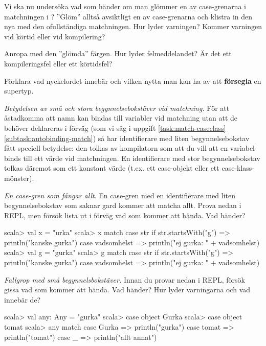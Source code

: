 \Subtask Vi ska nu undersöka vad som händer om man glömmer en av case-grenarna i matchningen i ? ''Glöm'' alltså avsiktligt en av case-grenarna och klistra in den nya  med den ofullständiga matchningen. Hur lyder varningen? Kommer varningen vid körtid eller vid kompilering? 

\Subtask Anropa  med den ''glömda'' färgen. Hur lyder felmeddelandet? Är det ett kompileringsfel eller ett körtidsfel?

\Subtask\Pen Förklara vad nyckelordet  innebär och vilken nytta man kan ha av att \textbf{försegla} en supertyp.


\Task \emph{Betydelsen av små och stora begynnelsebokstäver vid matchning.} För att åstadkomma att namn kan bindas till variabler vid matchning utan att de behöver deklareras i förväg (som vi såg i uppgift \ref{task:match-caseclass}\ref{subtask:autobinding-match}) så har identifierare med liten begynnelsebokstav fått speciell betydelse: den tolkas av kompilatorn som att du vill att en variabel  binds till ett värde vid matchningen. En identifierare med stor begynnelsebokstav tolkas däremot som ett konstant värde (t.ex. ett case-objekt eller ett case-klass-mönster).

\Subtask \emph{En case-gren som fångar allt}. En case-gren med en identifierare med liten begynnelsebokstav som saknar gard kommer att matcha allt. Prova nedan i REPL, men försök lista ut i förväg vad som kommer att hända. Vad händer?
\begin{REPL}
scala> val x = "urka"
scala> x match {
         case str if str.startsWith("g") => println("kanske gurka")
         case vadsomhelst => println("ej gurka: " + vadsomhelst) 
       }
scala> val g = "gurka"
scala> g match {
         case str if str.startsWith("g") => println("kanske gurka")
         case vadsomhelst => println("ej gurka: " + vadsomhelst) 
       }
\end{REPL}

\Subtask \emph{Fallgrop med små begynnelsbokstäver.} Innan du provar nedan i REPL, försök gissa vad som kommer att hända. Vad händer? Hur lyder varningarna och vad innebär de?
\begin{REPL}       
scala> val any: Any = "gurka"
scala> case object Gurka
scala> case object tomat
scala> any match {
         case Gurka => println("gurka") 
         case tomat => println("tomat")
         case _ => println("allt annat")
       }
\end{REPL}


